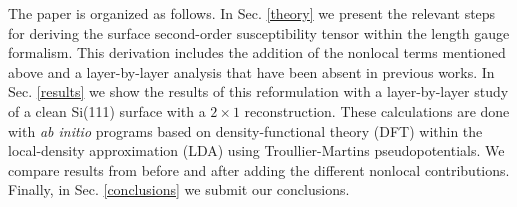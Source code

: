 The paper is organized as follows. 
In Sec. \ref{theory} we present the 
relevant steps for deriving the surface second-order susceptibility tensor 
within the length gauge formalism. This derivation includes the addition of 
the nonlocal terms mentioned above and a layer-by-layer analysis that have 
been absent in previous works. 
In Sec. \ref{results} we show the results of this 
reformulation with a layer-by-layer study of a clean Si(111) surface with a 
$2 \times 1$ reconstruction. These calculations are done with \emph{ab initio}
programs based on density-functional theory (DFT) within the local-density 
approximation (LDA) using Troullier-Martins pseudopotentials. We compare 
results from before and after adding the different nonlocal contributions.
Finally, in Sec. \ref{conclusions} we submit our conclusions.
